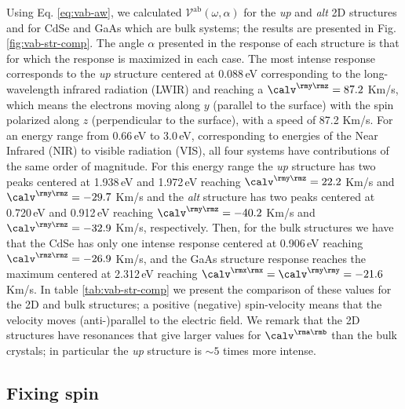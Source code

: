 \documentclass[prb,11pt,tightenlines,twocolumn,aps]{revtex4-1}
\begin{document}
Using  Eq. \eqref{eq:vab-aw}, we calculated 
$\mathcal{V}^{\mathrm{ab}}(\omega,\alpha)$ for the \emph{up} and
\emph{alt} 2D structures and for CdSe and GaAs which are bulk systems; 
the results
are presented in Fig. \ref{fig:vab-str-comp}. 
The angle $\alpha$ presented in
the response of each structure is that for which the response is maximized in
each case.
% 
The most intense response corresponds to the \emph{up} structure centered at
0.088\,eV 
corresponding to the long-wavelength infrared radiation (LWIR) 
and reaching a $\calv^{\rmy\rmz}=87.2$ Km/s, which means the
electrons moving along $y$ (parallel to the surface) with the spin
polarized along $z$ (perpendicular to the surface),
with a speed of 87.2 Km/s.
% 
For an energy range from 0.66\,eV to 3.0\,eV, 
corresponding
to energies of the Near Infrared (NIR) to visible radiation (VIS), 
all
four systems have contributions of the same order of magnitude.
% 
For this energy range the \emph{up} structure has two peaks centered at
1.938\,eV and 1.972\,eV reaching $\calv^{\rmy\rmz}=22.2$ Km/s and
$\calv^{\rmy\rmz}=-29.7$ Km/s and the 
\emph{alt} structure has two peaks centered at 0.720\,eV
and 0.912\,eV reaching 
$\calv^{\rmy\rmz}=-40.2$ Km/s
and
$\calv^{\rmy\rmz}=-32.9$ Km/s, 
respectively.
% 
Then, for the bulk structures we have that the CdSe has only one intense
response centered at 0.906\,eV reaching 
$\calv^{\rmz\rmz}=-26.9$ Km/s, 
and the
GaAs structure response reaches the maximum centered at
2.312\,eV reaching
$\calv^{\rmx\rmx}=\calv^{\rmy\rmy}=-21.6$ Km/s.
% 
In table \ref{tab:vab-str-comp} we present the comparison of these values for
the 2D and bulk structures; a positive (negative) spin-velocity means that the
velocity moves (anti-)parallel to the electric field.
% 
We remark that the 2D structures have resonances that give 
larger values for $\calv^{\rma\rmb}$ than the
bulk crystals; in particular
the \emph{up} structure is
$\sim 5$ times more intense.





\subsection{Fixing spin} %
\label{sec:res-fixspin}


\end{document}
